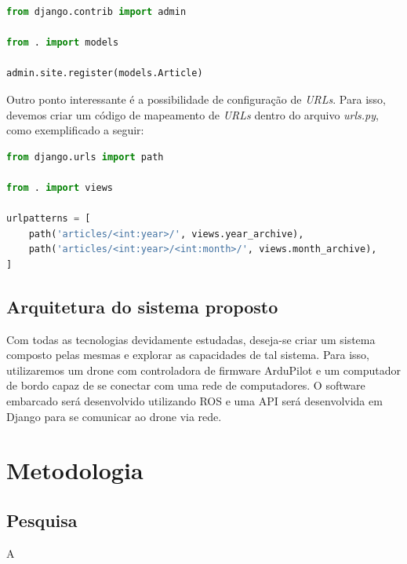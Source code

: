 \documentclass[12pt,a4paper,oneside]{book}
\begin{document}
\begin{lstlisting}[language=Python]
from django.contrib import admin

from . import models

admin.site.register(models.Article)
\end{lstlisting}

Outro ponto interessante é a possibilidade de configuração de \textit{URLs}. Para isso, devemos criar um código de mapeamento de \textit{URLs} dentro do arquivo \textit{urls.py}, como exemplificado a seguir:

\begin{lstlisting}[language=Python]
from django.urls import path

from . import views

urlpatterns = [
    path('articles/<int:year>/', views.year_archive),
    path('articles/<int:year>/<int:month>/', views.month_archive),
]
\end{lstlisting}


\section{Arquitetura do sistema proposto}

Com todas as tecnologias devidamente estudadas, deseja-se criar um sistema composto pelas mesmas e explorar as capacidades de tal sistema. Para isso, utilizaremos um drone com controladora de firmware ArduPilot e um computador de bordo capaz de se conectar com uma rede de computadores. O software embarcado será desenvolvido utilizando ROS e uma API será desenvolvida em Django para se comunicar ao drone via rede. 



\chapter{Metodologia}
\label{chapter:Metodologia}
%
\thispagestyle{empty} 
%
\section{Pesquisa}
%
A 
%
\end{document}
